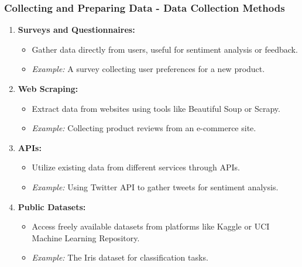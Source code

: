 \documentclass[aspectratio=169]{beamer}
\begin{document}
\begin{frame}[fragile]
    \frametitle{Collecting and Preparing Data - Data Collection Methods}
    \begin{enumerate}
        \item \textbf{Surveys and Questionnaires:} 
        \begin{itemize}
            \item Gather data directly from users, useful for sentiment analysis or feedback.
            \item \textit{Example:} A survey collecting user preferences for a new product.
        \end{itemize}
        
        \item \textbf{Web Scraping:} 
        \begin{itemize}
            \item Extract data from websites using tools like Beautiful Soup or Scrapy.
            \item \textit{Example:} Collecting product reviews from an e-commerce site.
        \end{itemize}

        \item \textbf{APIs:} 
        \begin{itemize}
            \item Utilize existing data from different services through APIs.
            \item \textit{Example:} Using Twitter API to gather tweets for sentiment analysis.
        \end{itemize}

        \item \textbf{Public Datasets:} 
        \begin{itemize}
            \item Access freely available datasets from platforms like Kaggle or UCI Machine Learning Repository.
            \item \textit{Example:} The Iris dataset for classification tasks.
        \end{itemize}
    \end{enumerate}
\end{frame}
\end{document}
